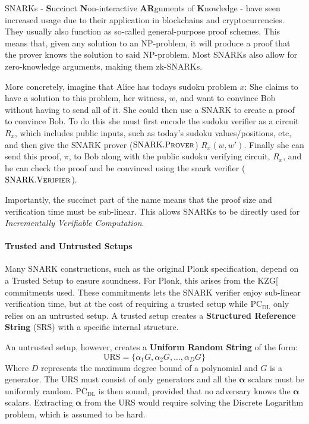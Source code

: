 \documentclass[
]{article}
\renewcommand*\a{\alpha}
\renewcommand{\vec}[1]{ \boldsymbol{#1} }
\newcommand*{\Prover}{\mathrm{\text{P\scriptsize ROVER}}}
\newcommand*{\Verifier}{\mathrm{\text{V\scriptsize ERIFIER}}}
\newcommand*{\SNARKProver}{\mathrm{\text{SNARK}}.\Prover}
\newcommand*{\SNARKVerifier}{\mathrm{\text{SNARK}}.\Verifier}
\newcommand*{\PCDL}{\text{PC}_{\text{DL}}}
\begin{document}
SNARKs - \textbf{S}uccinct \textbf{N}on-interactive \textbf{AR}guments
of \textbf{K}nowledge - have seen increased usage due to their
application in blockchains and cryptocurrencies. They usually also
function as so-called general-purpose proof schemes. This means that,
given any solution to an NP-problem, it will produce a proof that the
prover knows the solution to said NP-problem. Most SNARKs also allow for
zero-knowledge arguments, making them zk-SNARKs.

More concretely, imagine that Alice has todays sudoku problem \(x\): She
claims to have a solution to this problem, her witness, \(w\), and want
to convince Bob without having to send all of it. She could then use a
SNARK to create a proof to convince Bob. To do this she must first
encode the sudoku verifier as a circuit \(R_x\), which includes public
inputs, such as today's sudoku values/positions, etc, and then give the
SNARK prover (\(\SNARKProver\)) \(R_x(w,w')\). Finally she can send this
proof, \(\pi\), to Bob along with the public sudoku verifying circuit,
\(R_x\), and he can check the proof and be convinced using the snark
verifier (\(\SNARKVerifier\)).

Importantly, the succinct part of the name means that the proof size and
verification time must be sub-linear. This allows SNARKs to be directly
used for \emph{Incrementally Verifiable Computation}.

\paragraph{Trusted and Untrusted
Setups}\label{trusted-and-untrusted-setups}

Many SNARK constructions, such as the original Plonk specification,
depend on a Trusted Setup to ensure soundness. For Plonk, this arises
from the KZG{[}\citeproc{ref-kzg}{Kate et al. 2010}{]} commitments used.
These commitments lets the SNARK verifier enjoy sub-linear verification
time, but at the cost of requiring a trusted setup while \(\PCDL\) only
relies on an untrusted setup. A trusted setup creates a
\textbf{Structured Reference String} (SRS) with a specific internal
structure.

An untrusted setup, however, creates a \textbf{Uniform Random String} of
the form: \[\text{URS} = \{ \a_1G, \a_2G, \dots, \a_DG \}\] Where \(D\)
represents the maximum degree bound of a polynomial and \(G\) is a
generator. The URS must consist of only generators and all the
\(\vec{\a}\) scalars must be uniformly random. \(\PCDL\) is then sound,
provided that no adversary knows the \(\vec{\a}\) scalars. Extracting
\(\vec{\a}\) from the URS would require solving the Discrete Logarithm
problem, which is assumed to be hard.
\end{document}

